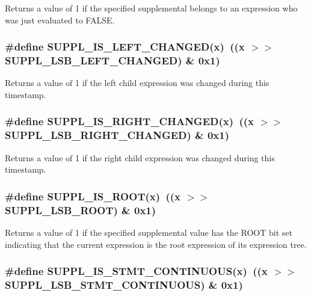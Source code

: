 Returns a value of 1 if the specified supplemental belongs to an expression who was just evaluated to FALSE. 
\subsubsection{\setlength{\rightskip}{0pt plus 5cm}\#define SUPPL\_\-IS\_\-LEFT\_\-CHANGED(x)\ ((x $>$$>$ SUPPL\_\-LSB\_\-LEFT\_\-CHANGED) \& 0x1)}\label{group__expr__suppl_a31}


Returns a value of 1 if the left child expression was changed during this timestamp. 
\subsubsection{\setlength{\rightskip}{0pt plus 5cm}\#define SUPPL\_\-IS\_\-RIGHT\_\-CHANGED(x)\ ((x $>$$>$ SUPPL\_\-LSB\_\-RIGHT\_\-CHANGED) \& 0x1)}\label{group__expr__suppl_a32}


Returns a value of 1 if the right child expression was changed during this timestamp. 
\subsubsection{\setlength{\rightskip}{0pt plus 5cm}\#define SUPPL\_\-IS\_\-ROOT(x)\ ((x $>$$>$ SUPPL\_\-LSB\_\-ROOT) \& 0x1)}\label{group__expr__suppl_a22}


Returns a value of 1 if the specified supplemental value has the ROOT bit set indicating that the current expression is the root expression of its expression tree. 
\subsubsection{\setlength{\rightskip}{0pt plus 5cm}\#define SUPPL\_\-IS\_\-STMT\_\-CONTINUOUS(x)\ ((x $>$$>$ SUPPL\_\-LSB\_\-STMT\_\-CONTINUOUS) \& 0x1)}\label{group__expr__suppl_a26}


